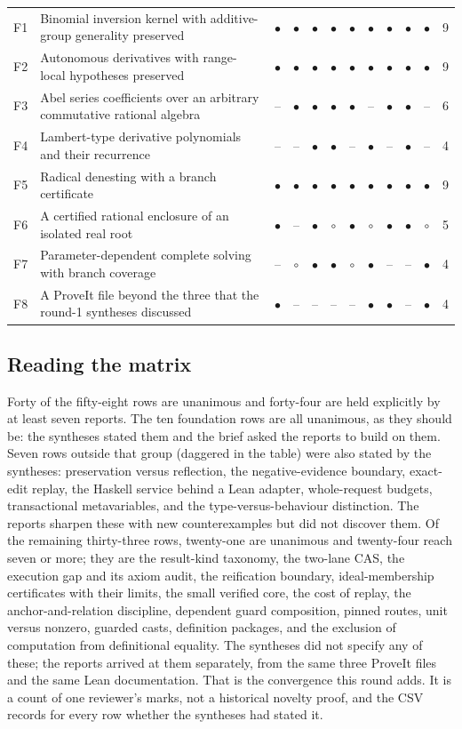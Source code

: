 \documentclass[11pt,a4paper]{article}
\newcommand{\Yy}{$\bullet$}
\newcommand{\Pp}{$\circ$}
\newcommand{\Nn}{--}
\theoremstyle{definition}
\begin{document}
\begin{longtable}{@{}L{7mm}L{67mm}CCCCCCCCCL{5mm}@{}}
F1 & Binomial inversion kernel with additive-group generality preserved & \Yy & \Yy & \Yy & \Yy & \Yy & \Yy & \Yy & \Yy & \Yy & 9\\
F2 & Autonomous derivatives with range-local hypotheses preserved & \Yy & \Yy & \Yy & \Yy & \Yy & \Yy & \Yy & \Yy & \Yy & 9\\
F3 & Abel series coefficients over an arbitrary commutative rational algebra & \Nn & \Yy & \Yy & \Yy & \Yy & \Nn & \Yy & \Yy & \Nn & 6\\
F4 & Lambert-type derivative polynomials and their recurrence & \Nn & \Nn & \Yy & \Yy & \Nn & \Yy & \Nn & \Yy & \Nn & 4\\
F5 & Radical denesting with a branch certificate & \Yy & \Yy & \Yy & \Yy & \Yy & \Yy & \Yy & \Yy & \Yy & 9\\
F6 & A certified rational enclosure of an isolated real root & \Yy & \Nn & \Yy & \Pp & \Yy & \Pp & \Yy & \Yy & \Pp & 5\\
F7 & Parameter-dependent complete solving with branch coverage & \Nn & \Pp & \Yy & \Yy & \Pp & \Yy & \Nn & \Nn & \Yy & 4\\
F8 & A ProveIt file beyond the three that the round-1 syntheses discussed & \Yy & \Nn & \Nn & \Nn & \Nn & \Yy & \Yy & \Nn & \Yy & 4\\
\bottomrule
\end{longtable}
\endgroup

\subsection{Reading the matrix}
Forty of the fifty-eight rows are unanimous and forty-four are held explicitly by at least seven reports. The ten foundation rows are all unanimous, as they should be: the syntheses stated them and the brief asked the reports to build on them. Seven rows outside that group (daggered in the table) were also stated by the syntheses: preservation versus reflection, the negative-evidence boundary, exact-edit replay, the Haskell service behind a Lean adapter, whole-request budgets, transactional metavariables, and the type-versus-behaviour distinction. The reports sharpen these with new counterexamples but did not discover them. Of the remaining thirty-three rows, twenty-one are unanimous and twenty-four reach seven or more; they are the result-kind taxonomy, the two-lane CAS, the execution gap and its axiom audit, the reification boundary, ideal-membership certificates with their limits, the small verified core, the cost of replay, the anchor-and-relation discipline, dependent guard composition, pinned routes, unit versus nonzero, guarded casts, definition packages, and the exclusion of computation from definitional equality. The syntheses did not specify any of these; the reports arrived at them separately, from the same three ProveIt files and the same Lean documentation. That is the convergence this round adds. It is a count of one reviewer's marks, not a historical novelty proof, and the CSV records for every row whether the syntheses had stated it.
\end{document}
